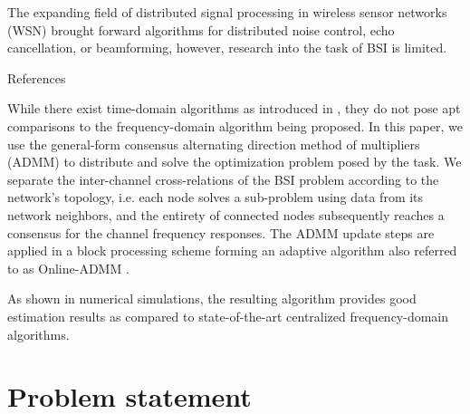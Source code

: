 \documentclass{article}
\begin{document}
The expanding field of distributed signal processing in wireless sensor networks (WSN) brought forward algorithms for distributed noise control, echo cancellation, or beamforming, however, research into the task of BSI is limited.
\begin{todo}
    References
\end{todo}
While there exist time-domain algorithms as introduced in \cite{yuDistributedBlindSystem2014,liuDistributedBlindIdentification2016,liuDistributedRecursiveBlind2017}, they do not pose apt comparisons to the frequency-domain algorithm being proposed.
In this paper, we use the general-form consensus alternating direction method of multipliers (ADMM) \cite{boydDistributedOptimizationStatistical2011} to distribute and solve the optimization problem posed by the task.
We separate the inter-channel cross-relations of the BSI problem according to the network's topology, i.e. each node solves a sub-problem using data from its network neighbors, and the entirety of connected nodes subsequently reaches a consensus for the channel frequency responses.
The ADMM update steps are applied in a block processing scheme forming an adaptive algorithm also referred to as Online-ADMM \cite{wangOnlineAlternatingDirection2013,hosseiniOnlineDistributedADMM2014}.

As shown in numerical simulations, the resulting algorithm provides good estimation results as compared to state-of-the-art centralized frequency-domain algorithms.

\section{Problem statement}
\label{sec:problem_statement}

\end{document}
